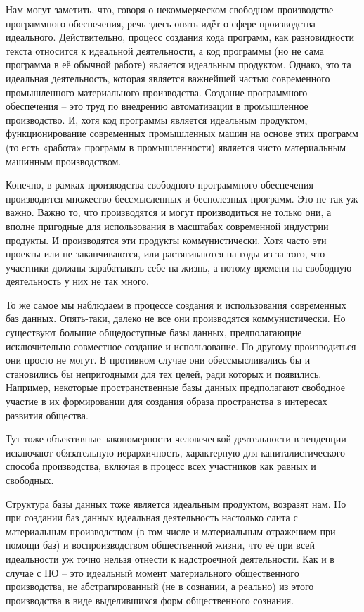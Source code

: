 \documentclass[12pt,a4paper,openany]{book}
\begin{document}
Нам могут заметить, что, говоря о некоммерческом свободном производстве программного обеспечения, речь здесь опять идёт о сфере производства идеального. Действительно, процесс создания кода программ, как разновидности текста относится к идеальной деятельности, а код программы (но не сама программа в её обычной работе) является идеальным продуктом. Однако, это та идеальная деятельность, которая является важнейшей частью современного промышленного материального производства. Создание программного обеспечения – это труд по внедрению автоматизации в промышленное производство. И, хотя код программы является идеальным продуктом, функционирование современных промышленных машин на основе этих программ (то есть «работа» программ в промышленности) является чисто материальным машинным производством.

Конечно, в рамках производства свободного программного обеспечения производится множество бессмысленных и бесполезных программ. Это не так уж важно. Важно то, что производятся и могут производиться не только они, а вполне пригодные для использования в масштабах современной индустрии продукты. И производятся эти продукты коммунистически. Хотя часто эти проекты или не заканчиваются, или растягиваются на годы из-за того, что участники должны зарабатывать себе на жизнь, а потому времени на свободную деятельность у них не так много.

То же самое мы наблюдаем в процессе создания и использования современных баз данных. Опять-таки, далеко не все они производятся коммунистически. Но существуют большие общедоступные базы данных, предполагающие исключительно совместное создание и использование. По-другому производиться они просто не могут. В противном случае они обессмысливались бы и становились бы непригодными для тех целей, ради которых и появились. Например, некоторые пространственные базы данных предполагают свободное участие в их формировании для создания образа пространства в интересах развития общества.

Тут тоже объективные закономерности человеческой деятельности в тенденции исключают обязательную иерархичность, характерную для капиталистического способа производства, включая в процесс всех участников как равных и свободных.

Структура базы данных тоже является идеальным продуктом, возразят нам. Но при создании баз данных идеальная деятельность настолько слита с материальным производством (в том числе и материальным отражением при помощи баз) и воспроизводством общественной жизни, что её при всей идеальности уж точно нельзя отнести к надстроечной деятельности. Как и в случае с ПО – это идеальный момент материального общественного производства, не абстрагированный (не в сознании, а реально) из этого производства в виде выделившихся форм общественного сознания.
\end{document}
